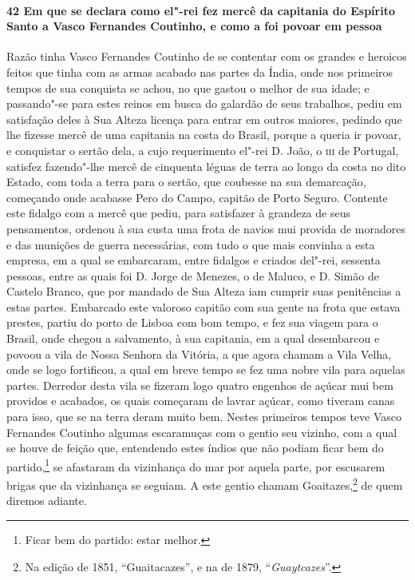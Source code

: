 \paragraph{42 Em que se declara como el"-rei fez mercê da capitania do Espírito Santo a
Vasco Fernandes Coutinho, e como a foi povoar em pessoa}

Razão tinha Vasco Fernandes Coutinho de se contentar com os grandes e heroicos feitos que
tinha com as armas acabado nas partes da Índia, onde nos primeiros tempos de sua conquista
se achou, no que gastou o melhor de sua idade; e passando"-se para estes reinos em busca do
galardão de seus trabalhos, pediu em satisfação deles à Sua Alteza licença para entrar em
outros maiores, pedindo que lhe fizesse mercê de uma capitania na costa do Brasil, porque
a queria ir povoar, e conquistar o sertão dela, a cujo requerimento el"-rei D. João, o
\textsc{iii} de Portugal, satisfez fazendo"-lhe mercê de cinquenta léguas de terra ao longo
da costa no dito Estado, com toda a terra para o sertão, que coubesse na sua demarcação,
começando onde acabasse Pero do Campo, capitão de Porto Seguro. Contente este fidalgo com
a mercê que pediu, para satisfazer à grandeza de seus pensamentos, ordenou à sua custa uma
frota de navios mui provida de moradores e das munições de guerra necessárias, com tudo o
que mais convinha a esta empresa, em a qual se embarcaram, entre fidalgos e criados
del"-rei, sessenta pessoas, entre as quais foi D. Jorge de Menezes, o de Maluco, e D. Simão
de Castelo Branco, que por mandado de Sua Alteza iam cumprir suas penitências a estas
partes. Embarcado este valoroso capitão com sua gente na frota que estava prestes, partiu
do porto de Lisboa com bom tempo, e fez sua viagem para o Brasil, onde chegou a
salvamento, à sua capitania, em a qual desembarcou e povoou a vila de Nossa Senhora da
Vitória, a que agora chamam a Vila Velha, onde se logo fortificou, a qual em breve tempo
se fez uma nobre vila para aquelas partes. Derredor desta vila se fizeram logo quatro
engenhos de açúcar mui bem providos e acabados, os quais começaram de lavrar açúcar, como
tiveram canas para isso, que se na terra deram muito bem. Nestes primeiros tempos teve
Vasco Fernandes Coutinho algumas escaramuças com o gentio seu vizinho, com a qual se houve
de feição que, entendendo estes índios que não podiam ficar bem do partido,\footnote{ Ficar
bem do partido: estar melhor.} se afastaram da vizinhança do mar por aquela parte, por
escusarem brigas que da vizinhança se seguiam. A este gentio chamam Goaitazes,\footnote{ Na
edição de 1851, ``Guaitacazes'', e na de 1879, ``\textit{Guaytcazes}''.} de quem diremos
adiante.

